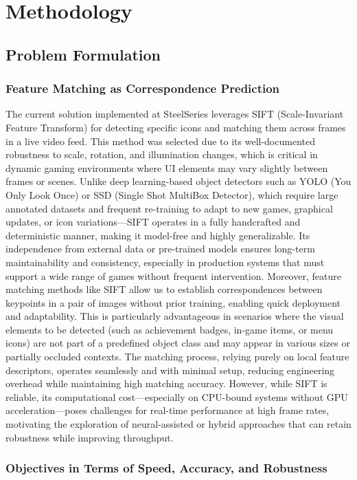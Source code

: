 \chapter{Methodology}
\section{Problem Formulation}
\subsection{Feature Matching as Correspondence Prediction}
The current solution implemented at SteelSeries leverages SIFT (Scale-Invariant
Feature Transform) for detecting specific icons and matching them across frames
in a live video feed. This method was selected due to its well-documented
robustness to scale, rotation, and illumination changes, which is critical in
dynamic gaming environments where UI elements may vary slightly between frames
or scenes. Unlike deep learning-based object detectors such as YOLO (You Only
Look Once) or SSD (Single Shot MultiBox Detector), which require large
annotated datasets and frequent re-training to adapt to new games, graphical
updates, or icon variations—SIFT operates in a fully handcrafted and
deterministic manner, making it model-free and highly generalizable. Its
independence from external data or pre-trained models ensures long-term
maintainability and consistency, especially in production systems that must
support a wide range of games without frequent intervention. Moreover, feature
matching methods like SIFT allow us to establish correspondences between
keypoints in a pair of images without prior training, enabling quick deployment
and adaptability. This is particularly advantageous in scenarios where the
visual elements to be detected (such as achievement badges, in-game items, or
menu icons) are not part of a predefined object class and may appear in various
sizes or partially occluded contexts. The matching process, relying purely on
local feature descriptors, operates seamlessly and with minimal setup, reducing
engineering overhead while maintaining high matching accuracy. However, while
SIFT is reliable, its computational cost—especially on CPU-bound systems
without GPU acceleration—poses challenges for real-time performance at high
frame rates, motivating the exploration of neural-assisted or hybrid approaches
that can retain robustness while improving throughput.
\subsection{Objectives in Terms of Speed, Accuracy, and Robustness}

